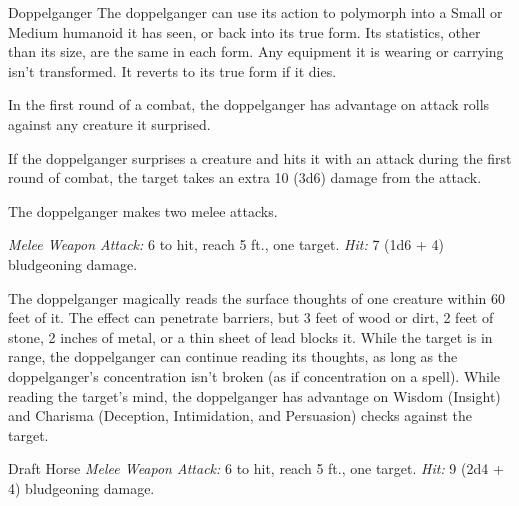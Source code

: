 \documentclass[10pt,a4paper,twoside,bg=print,twocolumn,openany,nodeprecatedcode]{dndbook}
\begin{document}
\begin{DndMonster}[float=t]{Doppelganger}
\DndMonsterBasics[
armor-class = {14},
hit-points = {\DndDice{8d8 + 16}},
speed = {30 ft.}
]
\DndMonsterAbilityScores[
 str = 11,
 dex = 18,
 con = 14,
 int = 11,
 wis = 12,
 cha = 14
]
\DndMonsterDetails[
skills = {Deception +6, Insight +3},
condition-immunities = {charmed},
senses = {darkvision 60 ft., passive perception 11},
languages = {Common},
challenge = 3,
]
The doppelganger can use its action to polymorph into a Small or Medium humanoid it has seen, or back into its true form. Its statistics, other than its size, are the same in each form. Any equipment it is wearing or carrying isn't transformed. It reverts to its true form if it dies.

In the first round of a combat, the doppelganger has advantage on attack rolls against any creature it surprised.

If the doppelganger surprises a creature and hits it with an attack during the first round of combat, the target takes an extra 10 (3d6) damage from the attack.

The doppelganger makes two melee attacks.

\textsl{Melee Weapon Attack:} 6 to hit, reach 5 ft., one target. \textsl{Hit:} 7 (1d6 + 4) bludgeoning damage.

The doppelganger magically reads the surface thoughts of one creature within 60 feet of it. The effect can penetrate barriers, but 3 feet of wood or dirt, 2 feet of stone, 2 inches of metal, or a thin sheet of lead blocks it. While the target is in range, the doppelganger can continue reading its thoughts, as long as the doppelganger's concentration isn't broken (as if concentration on a spell). While reading the target's mind, the doppelganger has advantage on Wisdom (Insight) and Charisma (Deception, Intimidation, and Persuasion) checks against the target.

\end{DndMonster}



\begin{DndMonster}[float=t]{Draft Horse}
\DndMonsterBasics[
armor-class = {10},
hit-points = {\DndDice{3d10 + 3}},
speed = {40 ft.}
]
\DndMonsterAbilityScores[
 str = 18,
 dex = 10,
 con = 12,
 int = 2,
 wis = 11,
 cha = 7
]
\DndMonsterDetails[
challenge = 1/4,
]
\textsl{Melee Weapon Attack:} 6 to hit, reach 5 ft., one target. \textsl{Hit:} 9 (2d4 + 4) bludgeoning damage.

\end{DndMonster}
\end{document}
